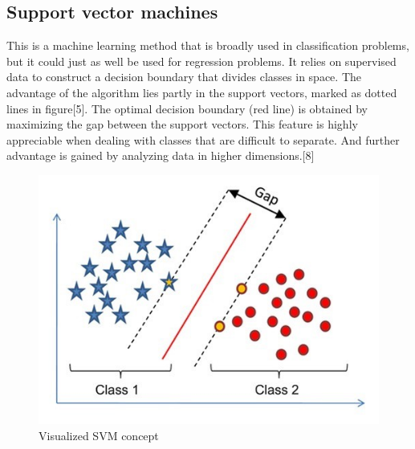 	\subsection{Support vector machines}
This is a machine learning method that is broadly used in classification problems, but it could just as well be used for regression problems. It relies on supervised data to construct a decision boundary that divides classes in space. The advantage of the algorithm lies partly in the support vectors, marked as dotted lines in figure[5]. The optimal decision boundary (red line) is obtained by maximizing the gap between the support vectors. This feature is highly appreciable when dealing with classes that are difficult to separate. And further advantage is gained by analyzing data in higher dimensions.[8]
\\
\par
\begin{figure}[H]
\centering
\includegraphics[scale=0.4]{pictures/svm_hyper.jpg} 
\caption{Visualized SVM concept}
\end{figure}

